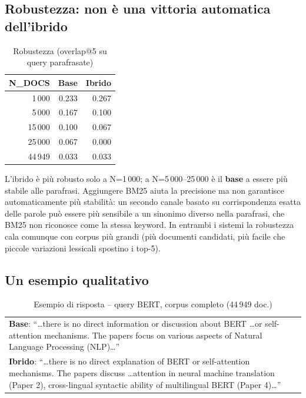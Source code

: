 \documentclass[12pt,a4paper]{article}
\begin{document}
\subsection{Robustezza: non \`e una vittoria automatica dell'ibrido}

\begin{table}[H]
  \centering
  \caption{Robustezza (overlap@5 su query parafrasate)}
  \begin{tabular}{rrr}
    \toprule
    \textbf{N\_DOCS} & \textbf{Base} & \textbf{Ibrido} \\
    \midrule
    1\,000  & 0.233 & 0.267 \\
    5\,000  & 0.167 & 0.100 \\
    15\,000 & 0.100 & 0.067 \\
    25\,000 & 0.067 & 0.000 \\
    44\,949 & 0.033 & 0.033 \\
    \bottomrule
  \end{tabular}
\end{table}

L'ibrido \`e pi\`u robusto solo a N=1\,000; a N=5\,000--25\,000 \`e il \textbf{base} a essere pi\`u stabile alle parafrasi. Aggiungere BM25 aiuta la precisione ma non garantisce automaticamente pi\`u stabilit\`a: un secondo canale basato su corrispondenza esatta delle parole pu\`o essere pi\`u sensibile a un sinonimo diverso nella parafrasi, che BM25 non riconosce come la stessa keyword. In entrambi i sistemi la robustezza cala comunque con corpus pi\`u grandi (pi\`u documenti candidati, pi\`u facile che piccole variazioni lessicali spostino i top-5).

\subsection{Un esempio qualitativo}

\begin{table}[H]
  \centering
  \caption{Esempio di risposta -- query BERT, corpus completo (44\,949 doc.)}
  \begin{tabular}{p{14.5cm}}
    \toprule
    \textbf{Base}: ``\ldots there is no direct information or discussion about BERT \ldots or self-attention mechanisms. The papers focus on various aspects of Natural Language Processing (NLP)\ldots'' \\[0.5em]
    \textbf{Ibrido}: ``\ldots there is no direct explanation of BERT or self-attention mechanisms. The papers discuss \ldots attention in neural machine translation (Paper 2), cross-lingual syntactic ability of multilingual BERT (Paper 4)\ldots'' \\
    \bottomrule
  \end{tabular}
\end{table}
\end{document}
